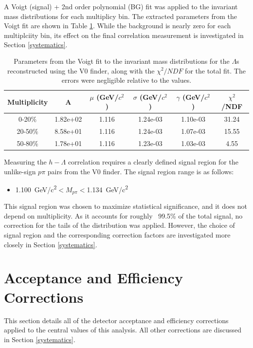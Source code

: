 \documentclass[ALICE,manyauthors]{ALICE_analysis_notes}
\begin{document}
\begin{itemize}
 A Voigt (signal) + 2nd order polynomial (BG) fit was applied to the invariant mass distributions for each multiplicy bin. The extracted parameters from the Voigt fit are shown in Table \ref{voigt_parameters}. While the background is nearly zero for each multiplciity bin, its effect on the final correlation measurement is investigated in Section \ref{systematics}.

\begin{table}[h!]
    \centering
\begin{tabular}{| c | c | c | c | c | c | }
\hline
Multiplicity & A & $\mu$ (GeV/$c^2$) & $\sigma$ (GeV/$c^2$) & $\gamma$ (GeV/$c^2$) & $\chi^2$/NDF \\
\hline
0-20\% & 1.82e+02  & 1.116 & 1.24e-03 & 1.10e-03 & 31.24\\
20-50\% & 8.58e+01 & 1.116 & 1.24e-03 & 1.07e-03 & 15.55\\
50-80\% & 1.78e+01 & 1.116 & 1.23e-03 & 1.03e-03 & 4.55\\
\hline
\end{tabular}
\caption{Parameters from the Voigt fit to the invariant mass distributions for the $\Lambda$s reconstructed using the V0 finder, along with the $\chi^2/NDF$ for the total fit. The errors were negligible relative to the values.}
\label{voigt_parameters}
\end{table}

 Measuring the $h-\Lambda$ correlation requires a clearly defined signal region for the unlike-sign $p\pi$ pairs from the V0 finder. The signal region range is as follows:

\begin{itemize}
	\item {}  \SI{1.100}{GeV/c^2}$< M_{p\pi} < $\SI{1.134}{GeV/c^2}
\end{itemize}

This signal region was chosen to maximize statistical significance, and it does not depend on multiplicity. As it accounts for roughly ~99.5\% of the total signal, no correction for the tails of the distribution was applied. However, the choice of signal region and the corresponding correction factors are investigated more closely in Section \ref{systematics}.

\section{Acceptance and Efficiency Corrections}
\label{efficiency_acceptance}
This section details all of the detector acceptance and efficiency corrections applied to the central values of this analysis. All other corrections are discussed in Section \ref{systematics}.


\end{itemize}
\end{document}
